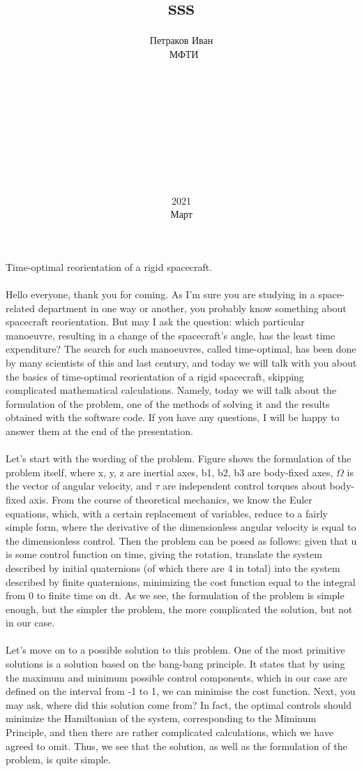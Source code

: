 \documentclass[12pt,a4paper, titlepage]{article}
\title{sss}
\date{2021\\Март}
\author{Петраков Иван\\\ МФТИ\\\\\\\\\\\\\\\\\\\\}
\begin{document}
Time-optimal reorientation of a rigid spacecraft.
\\
\\
Hello everyone, thank you for coming. As I'm sure you are studying in a space-related department in one way or another, you probably know something about spacecraft reorientation. But may I ask the question: which particular manoeuvre, resulting in a change of the spacecraft's angle, has the least time expenditure? The search for such manoeuvres, called time-optimal, has been done by many scientists of this and last century, and today we will talk with you about the basics of time-optimal reorientation of a rigid spacecraft, skipping complicated mathematical calculations. Namely, today we will talk about the formulation of the problem, one of the methods of solving it and the results obtained with the software code. If you have any questions, I will be happy to answer them at the end of the presentation.
\\
\\
Let's start with the wording of the problem. Figure shows the formulation of the problem itself, where x, y, z are inertial axes, b1, b2, b3 are body-fixed axes, $\Omega$ is the vector of angular velocity, and $\tau$ are independent control torques about body-fixed axis. From the course of theoretical mechanics, we know the Euler equations, which, with a certain replacement of variables, reduce to a fairly simple form, where the derivative of the dimensionless angular velocity is equal to the dimensionless control. Then the problem can be posed as follows: given that u is some control function on time, giving the rotation, translate the system described by initial quaternions (of which there are 4 in total) into the system described by finite quaternions, minimizing the cost function equal to the integral from 0 to finite time on dt. As we see, the formulation of the problem is simple enough, but the simpler the problem, the more complicated the solution, but not in our case.
\\
\\
Let's move on to a possible solution to this problem. One of the most primitive solutions is a solution based on the bang-bang principle. It states that by using the maximum and minimum possible control components, which in our case are defined on the interval from -1 to 1, we can minimise the cost function. Next, you may ask, where did this solution come from? In fact, the optimal controls should minimize the Hamiltonian of the system, corresponding to the Miminum Principle, and then there are rather complicated calculations, which we have agreed to omit. Thus, we see that the solution, as well as the formulation of the problem, is quite simple.
\end{document}
